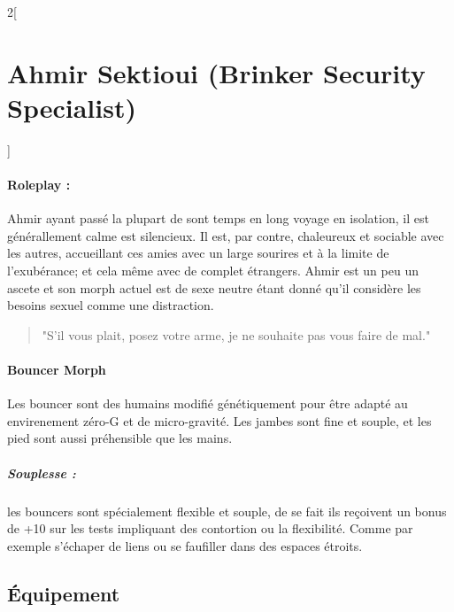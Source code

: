 \documentclass[a4paper,9pt]{article}
\begin{document}
\begin{multicols}{2}[\section*{Ahmir Sektioui (Brinker Security Specialist)}]
   \paragraph{Roleplay :}
   Ahmir ayant passé la plupart de sont temps en long voyage en isolation, il
   est générallement calme est silencieux.
   Il est, par contre, chaleureux et sociable avec les autres, accueillant ces
   amies avec un large sourires et à la limite de l'exubérance; et cela
   même avec de complet étrangers.
   Ahmir est un peu un ascete et son morph actuel est de sexe neutre étant
   donné qu'il considère les besoins sexuel comme une distraction.

   \begin{quote}
      "S'il vous plait, posez votre arme, je ne souhaite pas vous faire
      de mal."
   \end{quote}

   \paragraph{Bouncer Morph}
   Les bouncer sont des humains modifié génétiquement pour être adapté au envirenement zéro-G
   et de micro-gravité.
   Les jambes sont fine et souple, et les pied sont aussi préhensible que les
   mains.

   \subparagraph{Souplesse :} les bouncers sont spécialement flexible et souple,
   de se fait ils reçoivent un bonus de +10 sur les tests impliquant des contortion
   ou la flexibilité. Comme par exemple s'échaper de liens ou se faufiller dans
   des espaces étroits.

   \subsection*{Équipement}


\end{multicols}
\end{document}
